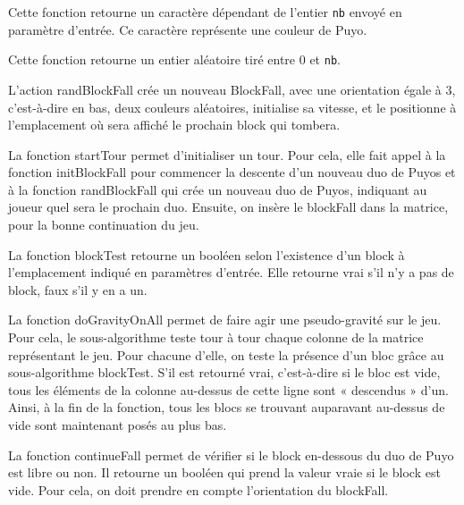 \documentclass[11pt]{report}
\renewcommand{\tt}[1]{\texttt{#1}}
\begin{document}
Cette fonction retourne un caractère dépendant de l'entier \tt{nb} envoyé en paramètre d'entrée. Ce caractère représente une couleur de Puyo. 



Cette fonction retourne un entier aléatoire tiré entre 0 et \tt{nb}. 



L’action randBlockFall crée un nouveau BlockFall, avec une orientation égale à 3, c’est-à-dire en bas, deux couleurs aléatoires, initialise sa vitesse, et le positionne à l’emplacement où sera affiché le prochain block qui tombera.


La fonction startTour permet d’initialiser un tour. Pour cela, elle fait appel à la fonction initBlockFall pour commencer la descente d'un nouveau duo de Puyos et à la fonction randBlockFall qui crée un nouveau duo de Puyos, indiquant au joueur quel sera le prochain duo. Ensuite, on insère le blockFall dans la matrice, pour la bonne continuation du jeu.



La fonction blockTest retourne un booléen selon l’existence d’un block à l’emplacement indiqué en paramètres d'entrée. Elle retourne vrai s'il n'y a pas de block, faux s'il y en a un. 



La fonction doGravityOnAll permet de faire agir une pseudo-gravité sur le jeu. Pour cela, le sous-algorithme teste tour à tour chaque colonne de la matrice représentant le jeu. Pour chacune d’elle, on teste la présence d’un bloc grâce au sous-algorithme blockTest. S’il est retourné vrai, c’est-à-dire si le bloc est vide, tous les éléments de la colonne au-dessus de cette ligne sont « descendus » d’un. Ainsi, à la fin de la fonction, tous les blocs se trouvant auparavant au-dessus de vide sont maintenant posés au plus bas.

 

La fonction continueFall permet de vérifier si le block en-dessous du duo de Puyo est libre ou non. Il retourne un booléen qui prend la valeur vraie si le block est vide. Pour cela, on doit prendre en compte l'orientation du blockFall.
\end{document}
